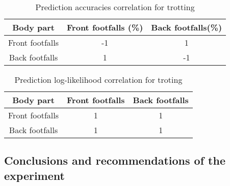 \begin{table}[h!] 
	\centering
	\begin{tabular}{ |c|c|c|} 	
		\hline	
		\textbf{Body part} & \textbf{Front footfalls (\%)} &  \textbf{Back footfalls(\%)}\\ 
		\hline
		Front footfalls &  -1 & 1\\ 
		\hline
		Back footfalls & 1 & -1 \\ 
		\hline	   	
	\end{tabular}
	\caption{Prediction accuracies correlation for trotting}
	\label{tab:front-back-trot-acc-corr}
\end{table}


\begin{table}[h!] 
	\centering
	\begin{tabular}{ |c|c|c|} 	
		\hline	
		\textbf{Body part} & \textbf{Front footfalls} &  \textbf{Back footfalls}\\ 
		\hline
		Front footfalls & 1 & 1\\ 
		\hline
		Back footfalls & 1 & 1\\ 
		\hline	   	
	\end{tabular}
	\caption{Prediction log-likelihood correlation for troting}
	\label{tab:front-back-trot-log-corr}
\end{table}

\subsection{Conclusions and recommendations of the experiment}